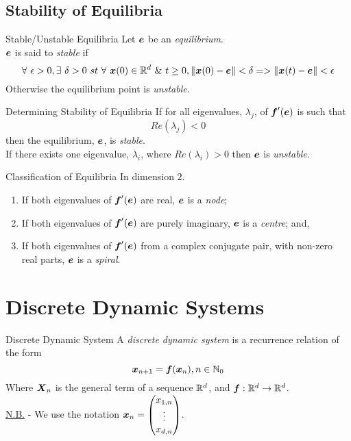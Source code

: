 \documentclass[11pt,a4paper]{article}
\begin{document}
\subsection{Stability of Equilibria}

\subtitle{Definition 16.04 - }{Stable/Unstable Equilibria}
Let $\boldsymbol{e}$ be an \textit{equilibrium}.\\
$\boldsymbol{e}$ is said to \textit{stable} if
$$\forall\ \epsilon > 0, \exists\ \delta > 0\ st\ \forall\ \vect{x}(0) \in \real^d\ \&\ t \geq 0, \|\vect{x}(0) - \vect{e}\| < \delta => \|\vect{x}(t) - \vect{e}\| < \epsilon$$
Otherwise the equilibrium point is \textit{unstable}.\\

\subtitle{Theorem 16.05 - }{Determining Stability of Equilibria}
If for all eigenvalues, $\lambda_j$, of $\boldsymbol{f}'(\boldsymbol{e})$ is such that
$$Re(\lambda_j) < 0$$
then the equilibrium, $\boldsymbol{e}$, is \textit{stable}.\\
If there exists one eigenvalue, $\lambda_i$, where $Re(\lambda_i) > 0$ then $\boldsymbol{e}$ is \textit{unstable}.\\

\subtitle{Definition 16.06 - }{Classification of Equilibria}
In dimension $2$.
\begin{enumerate}[label=\roman*)]
  \item If both eigenvalues of $\boldsymbol{f}'(\boldsymbol{e})$ are real, $\boldsymbol{e}$ is a \textit{node};
  \item If both eigenvalues of $\boldsymbol{f}'(\boldsymbol{e})$ are purely imaginary, $\boldsymbol{e}$ is a \textit{centre}; and,
  \item If both eigenvalues of $\boldsymbol{f}'(\boldsymbol{e})$ from a complex conjugate pair, with non-zero real parts, $\boldsymbol{e}$ is a \textit{spiral}.
\end{enumerate}

\section{Discrete Dynamic Systems}

\subtitle{Definition 17.01 - }{Discrete Dynamic System}
A \textit{discrete dynamic system} is a recurrence relation of the form
$$\boldsymbol{x}_{n+1} = \boldsymbol{f}(\boldsymbol{x}_n), n \in \mathbb{N}_0$$
Where $\boldsymbol{X}_n$ is the general term of a sequence $\mathbb{R}^d$, and $\boldsymbol{f} : \mathbb{R}^d \to \mathbb{R}^d$.\\
\underline{N.B.} - We use the notation $\boldsymbol{x}_n = \begin{pmatrix} x_{1, n} \\ \vdots \\ x_{d, n}\end{pmatrix}$.\\
\end{document}
